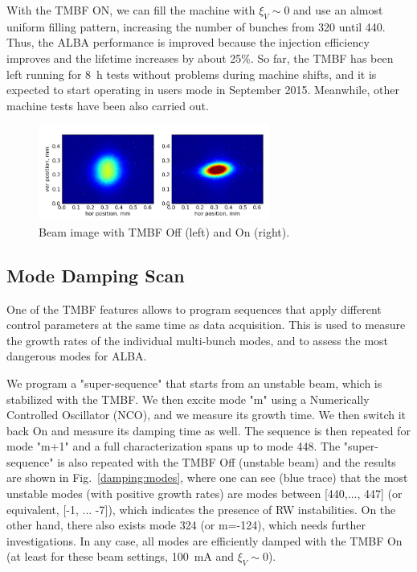 \documentclass[a4paper,
              ]{jacow}
\begin{document}
With the TMBF ON, we can fill the machine with $\xi_V \sim 0$ and use an almost uniform filling pattern, increasing the number of bunches from 320 until 440. Thus, the ALBA performance is improved because the injection efficiency improves and the lifetime increases by about 25\%.  
So far, the TMBF has been left running for 8~h tests without problems during machine shifts, and it is expected to start operating in users mode in September 2015. Meanwhile, other machine tests have been also carried out. 

\begin{figure}[hbt!]
   \centering
   \includegraphics[width=76mm]{img/TUPB046f6}   
   \caption{Beam image with TMBF Off (left) and On (right).}
   \label{pinhole:pic}
\end{figure}

\subsection{Mode Damping Scan}

One of the TMBF features allows to program sequences that apply different control parameters at the same time as data acquisition. This is used to measure the growth rates of the individual multi-bunch modes, and to assess the most dangerous modes for ALBA. 

We program a "super-sequence" that starts from an unstable beam, which is stabilized with the TMBF. We then excite mode "m" using a Numerically Controlled Oscillator (NCO), and we measure its growth time. We then switch it back On and measure its damping time as well. The sequence is then repeated for mode "m+1" and a full characterization spans up to mode 448. The "super-sequence" is also repeated with the TMBF Off (unstable beam) and the results are shown in Fig.~\ref{damping:modes}, where one can see (blue trace) that the most unstable modes (with positive growth rates) are modes between [440,..., 447] (or equivalent, [-1, ... -7]), which indicates the presence of RW instabilities. On the other hand, there also exists mode 324 (or m=-124), which needs further investigations. In any case, all modes are efficiently damped with the TMBF On (at least for these beam settings, 100~mA and $\xi_V \sim 0$).  
\end{document}
